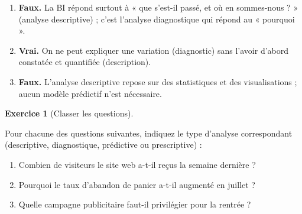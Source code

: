 \documentclass[
  french,
  letterpaper,
  open=any]{scrbook}
\providecommand{\tightlist}{%
  \setlength{\itemsep}{0pt}\setlength{\parskip}{0pt}}
\theoremstyle{definition}
\theoremstyle{definition}
\newtheorem{exercise}{Exercice}[section]
\theoremstyle{remark}
\begin{document}
\begin{tcolorbox}[enhanced jigsaw, arc=.35mm, bottomrule=.15mm, bottomtitle=1mm, breakable, colback=white, colbacktitle=quarto-callout-tip-color!10!white, colframe=quarto-callout-tip-color-frame, coltitle=black, left=2mm, leftrule=.75mm, opacityback=0, opacitybacktitle=0.6, rightrule=.15mm, title=\textcolor{quarto-callout-tip-color}{\faLightbulb}\hspace{0.5em}{Solution de l'exercice Exercice~\ref{exr-intro-ad-1}}, titlerule=0mm, toprule=.15mm, toptitle=1mm]

\begin{enumerate}
\def\labelenumi{\alph{enumi}.}
\tightlist
\item
  \textbf{Faux.} La BI répond surtout à « que s'est-il passé, et où en
  sommes-nous ? » (analyse descriptive) ; c'est l'analyse diagnostique
  qui répond au « pourquoi ».
\item
  \textbf{Vrai.} On ne peut expliquer une variation (diagnostic) sans
  l'avoir d'abord constatée et quantifiée (description).
\item
  \textbf{Faux.} L'analyse descriptive repose sur des statistiques et
  des visualisations ; aucun modèle prédictif n'est nécessaire.
\end{enumerate}

\end{tcolorbox}

\begin{exercise}[Classer les
questions]\protect\hypertarget{exr-intro-ad-2}{}\label{exr-intro-ad-2}

Pour chacune des questions suivantes, indiquez le type d'analyse
correspondant (descriptive, diagnostique, prédictive ou prescriptive) :

\begin{enumerate}
\def\labelenumi{\alph{enumi}.}
\tightlist
\item
  Combien de visiteurs le site web a-t-il reçus la semaine dernière ?
\item
  Pourquoi le taux d'abandon de panier a-t-il augmenté en juillet ?
\item
  Quelle campagne publicitaire faut-il privilégier pour la rentrée ?
\end{enumerate}

\end{exercise}
\end{document}
